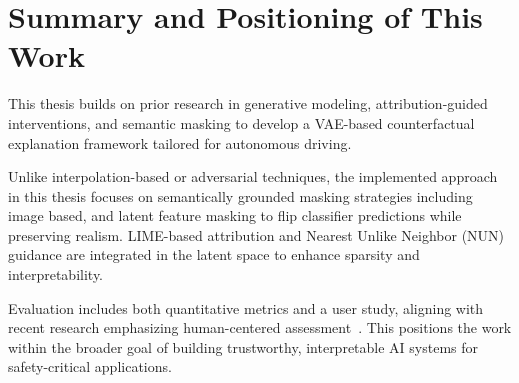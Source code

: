 \section{Summary and Positioning of This Work}
This thesis builds on prior research in generative modeling, attribution-guided interventions, and semantic masking to develop a VAE-based counterfactual explanation framework tailored for autonomous driving.

Unlike interpolation-based or adversarial techniques, the implemented approach in this thesis focuses on semantically grounded masking strategies including image based, and latent feature masking to flip classifier predictions while preserving realism. LIME-based attribution and Nearest Unlike Neighbor (NUN) guidance are integrated in the latent space to enhance sparsity and interpretability.

Evaluation includes both quantitative metrics and a user study, aligning with recent research emphasizing human-centered assessment~\cite{DELANEY2023103995}. This positions the work within the broader goal of building trustworthy, interpretable AI systems for safety-critical applications.